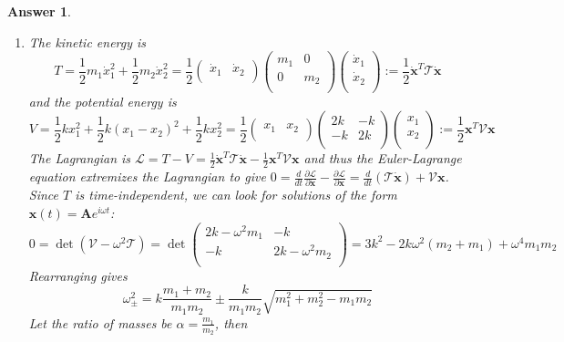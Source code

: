 \documentclass[a4paper]{article}
\newtheorem{ans}{Answer}[section]
\theoremstyle{new}
\begin{document}
\begin{ans}\leavevmode
\begin{enumerate}[label=(\roman*)]
\item The kinetic energy is
$$T=\frac{1}{2}m_1\dot{x}_1^2+\frac{1}{2}m_2\dot{x}_2^2=\frac{1}{2}\begin{pmatrix}\dot{x}_1&\dot{x}_2\\\end{pmatrix}\begin{pmatrix}m_1&0\\0&m_2\\\end{pmatrix}\begin{pmatrix}\dot{x}_1\\\dot{x}_2\\\end{pmatrix}:=\frac{1}{2}\mathbf{\dot{x}}^T\mathcal{T}\mathbf{\dot{x}}$$
and the potential energy is
$$V=\frac{1}{2}kx_1^2+\frac{1}{2}k(x_1-x_2)^2+\frac{1}{2}kx_2^2=\frac{1}{2}\begin{pmatrix}x_1&x_2\\\end{pmatrix}\begin{pmatrix}2k&-k\\-k&2k\\\end{pmatrix}\begin{pmatrix}x_1\\x_2\\\end{pmatrix}:=\frac{1}{2}\mathbf{x}^T\mathcal{V}\mathbf{x}$$
The Lagrangian is $\mathcal{L}=T-V=\frac{1}{2}\mathbf{\dot{x}}^T\mathcal{T}\mathbf{\dot{x}}-\frac{1}{2}\mathbf{x}^T\mathcal{V}\mathbf{x}$ and thus the Euler-Lagrange equation extremizes the Lagrangian to give $0=\frac{d}{dt}\frac{\partial\mathcal{L}}{\partial\mathbf{\dot{x}}}-\frac{\partial\mathcal{L}}{\partial\mathbf{x}}=\frac{d}{dt}(\mathcal{T}\mathbf{\dot{x}})+\mathcal{V}\mathbf{x}$. Since $T$ is time-independent, we can look for solutions of the form $\mathbf{x}(t)=\mathbf{A}e^{i\omega t}$:
$$0=\det(\mathcal{V}-\omega^2\mathcal{T})=\det\begin{pmatrix}2k-\omega^2m_1&-k\\-k&2k-\omega^2m_2\\\end{pmatrix}=3k^2-2k\omega^2(m_2+m_1)+\omega^4m_1m_2$$
Rearranging gives
$$\omega_\pm^2=k\frac{m_1+m_2}{m_1m_2}\pm\frac{k}{m_1m_2}\sqrt{m_1^2+m_2^2-m_1m_2}$$
Let the ratio of masses be $\alpha=\frac{m_1}{m_2}$, then

\end{enumerate}
\end{ans}
\end{document}
